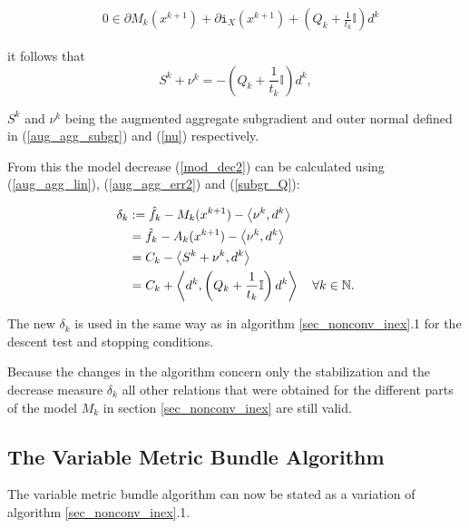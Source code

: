 \begin{align*}
	& 0 \in \partial M_k(x^{k+1})+\partial\mathtt{i}_{X}(x^{k+1})+\left(Q_k+\frac{1}{t_k}\mathbb{I}\right)d^k
	\label{Noll_opt_cond}
\end{align*}

it follows that 
\begin{equation}
	S^k+\nu^k = -\left(Q_k+\frac{1}{t_k}\mathbb{I}\right)d^k,
	\label{subgr_Q}
\end{equation}

\(S^k\) and \(\nu^k\) being the augmented aggregate subgradient and outer normal defined in (\ref{aug_agg_subgr}) and (\ref{nu}) respectively.

From this the model decrease (\ref{mod_dec2}) can be calculated using (\ref{aug_agg_lin}), (\ref{aug_agg_err2}) and (\ref{subgr_Q}):

\begin{equation}
\begin{split}
	\delta_k  &:= \hat{f}_k - M_k(x^{k+1}) - \left\langle\nu^k,d^k\right\rangle\\
	&= \hat{f}_k - A_k(x^{k+1}) - \left\langle\nu^k,d^k\right\rangle\\
	&= C_k - \left\langle S^k+\nu^k,d^k\right\rangle \\
	&= C_k + \left\langle d^k,\left(Q_k+\frac{1}{t_k}\mathbb{I}\right)d^k\right\rangle \quad \forall k \in \mathbb{N}.
	\label{Noll_delta}
\end{split}
\end{equation}

The new \(\delta_k\) is used in the same way as in algorithm \ref{sec_nonconv_inex}.1 for the descent test and stopping conditions.

Because the changes in the algorithm concern only the stabilization and the decrease measure \(\delta_k\) all other relations that were obtained for the different parts of the model \(M_k\) in section \ref{sec_nonconv_inex} are still valid.

\subsection{The Variable Metric Bundle Algorithm}

The variable metric bundle algorithm can now be stated as a variation of algorithm \ref{sec_nonconv_inex}.1.


